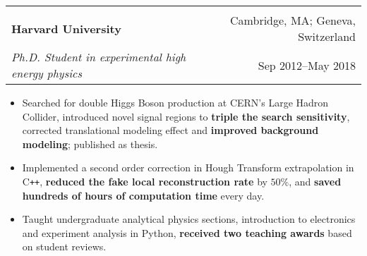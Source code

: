 \documentclass[letterpaper,11pt,oneside]{article}
\begin{document}
 \begin{flushleft}
 \vspace{-0.45cm}
 \begin{tabular}{@{} l r@{} }
    \hspace{0.6\linewidth} & \hspace{0.25\linewidth} \\
    \textbf{Harvard University} & \hspace{0.01\linewidth} Cambridge, MA; Geneva, Switzerland \\ 
    \textit{Ph.D. Student in experimental high energy physics} & \hspace{0.175\linewidth} Sep 2012--May 2018 \\ 
 \end{tabular}
 \end{flushleft}
 \begin{flushleft}
  \begin{small}
 \begin{itemize}[leftmargin=*]
  \item Searched for double Higgs Boson production at CERN's Large Hadron Collider, introduced novel signal regions to \textbf{triple the search sensitivity}, corrected translational modeling effect and \textbf{improved background modeling}; published as thesis.
  \item Implemented a second order correction in Hough Transform extrapolation in C\texttt{++}, \textbf{reduced the fake local reconstruction rate} by $50\%$, and \textbf{saved hundreds of hours of computation time} every day.
  \item Taught undergraduate analytical physics sections, introduction to electronics and experiment analysis in Python, \textbf{received two teaching awards} based on student reviews.
 \end{itemize}
  \end{small}
 \end{flushleft}
\end{document}
